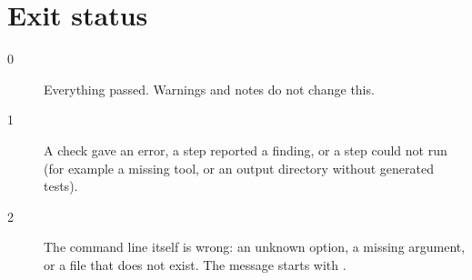 \section{Exit status}

\begin{description}
\item[0] Everything passed. Warnings and notes do not change this.
\item[1] A check gave an error, a step reported a finding, or a step could not run (for
  example a missing tool, or an output directory without generated tests).
\item[2] The command line itself is wrong: an unknown option, a missing argument, or a
  file that does not exist. The message starts with .
\end{description}
